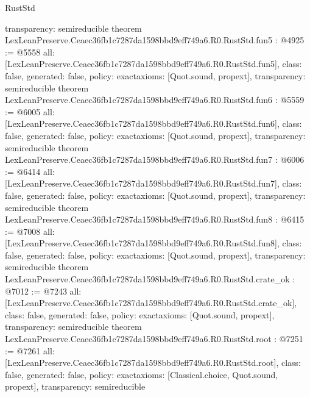 \begin{lexlean}{RustStd}
\begin{coremodule}
{  transparency: semireducible
}
theorem LexLeanPreserve.Ceaec36fb1c7287da1598bbd9eff749a6.R0.RustStd.fun5 : @4925 := @5558 {
  all: [LexLeanPreserve.Ceaec36fb1c7287da1598bbd9eff749a6.R0.RustStd.fun5],
  class: false,
  generated: false,
  policy: exact{axioms: [Quot.sound, propext]},
  transparency: semireducible
}
theorem LexLeanPreserve.Ceaec36fb1c7287da1598bbd9eff749a6.R0.RustStd.fun6 : @5559 := @6005 {
  all: [LexLeanPreserve.Ceaec36fb1c7287da1598bbd9eff749a6.R0.RustStd.fun6],
  class: false,
  generated: false,
  policy: exact{axioms: [Quot.sound, propext]},
  transparency: semireducible
}
theorem LexLeanPreserve.Ceaec36fb1c7287da1598bbd9eff749a6.R0.RustStd.fun7 : @6006 := @6414 {
  all: [LexLeanPreserve.Ceaec36fb1c7287da1598bbd9eff749a6.R0.RustStd.fun7],
  class: false,
  generated: false,
  policy: exact{axioms: [Quot.sound, propext]},
  transparency: semireducible
}
theorem LexLeanPreserve.Ceaec36fb1c7287da1598bbd9eff749a6.R0.RustStd.fun8 : @6415 := @7008 {
  all: [LexLeanPreserve.Ceaec36fb1c7287da1598bbd9eff749a6.R0.RustStd.fun8],
  class: false,
  generated: false,
  policy: exact{axioms: [Quot.sound, propext]},
  transparency: semireducible
}
theorem LexLeanPreserve.Ceaec36fb1c7287da1598bbd9eff749a6.R0.RustStd.crate_ok : @7012 := @7243 {
  all: [LexLeanPreserve.Ceaec36fb1c7287da1598bbd9eff749a6.R0.RustStd.crate_ok],
  class: false,
  generated: false,
  policy: exact{axioms: [Quot.sound, propext]},
  transparency: semireducible
}
theorem LexLeanPreserve.Ceaec36fb1c7287da1598bbd9eff749a6.R0.RustStd.root : @7251 := @7261 {
  all: [LexLeanPreserve.Ceaec36fb1c7287da1598bbd9eff749a6.R0.RustStd.root],
  class: false,
  generated: false,
  policy: exact{axioms: [Classical.choice, Quot.sound, propext]},
  transparency: semireducible
}


\end{coremodule}
\end{lexlean}
